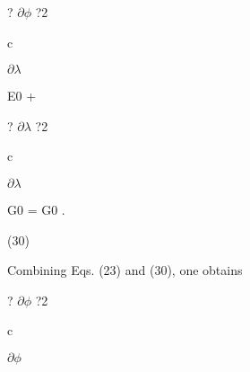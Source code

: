 \documentclass[a4paper,portrait,12pt]{article}
\begin{document}
\begin{flushleft}
? $\partial$$\phi$ ?2
\end{flushleft}


\begin{flushleft}
c
\end{flushleft}





\begin{flushleft}
$\partial$$\lambda$
\end{flushleft}





\begin{flushleft}
E0 +
\end{flushleft}





\begin{flushleft}
? $\partial$$\lambda$ ?2
\end{flushleft}


\begin{flushleft}
c
\end{flushleft}





\begin{flushleft}
$\partial$$\lambda$
\end{flushleft}





\begin{flushleft}
G0 = G0 .
\end{flushleft}





(30)





\begin{flushleft}
Combining Eqs. (23) and (30), one obtains
\end{flushleft}


\begin{flushleft}
? $\partial$$\phi$ ?2
\end{flushleft}


\begin{flushleft}
c
\end{flushleft}





\begin{flushleft}
$\partial$$\phi$
\end{flushleft}
\end{document}
